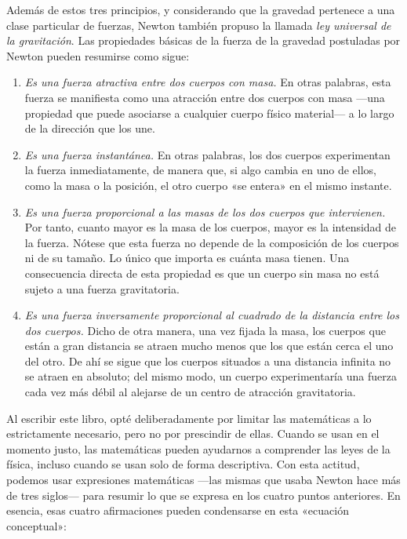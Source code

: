 Además de estos tres principios, y considerando que la gravedad pertenece a una clase
particular de fuerzas, Newton también propuso la llamada \emph{ley universal de la
gravitación}.
Las propiedades básicas de la fuerza de la gravedad
postuladas por Newton pueden resumirse como sigue:

\begin{enumerate}
\item
\emph{Es una fuerza atractiva entre dos cuerpos con masa.} En otras palabras,
esta fuerza se manifiesta como una atracción entre dos cuerpos con masa ---una
propiedad que puede asociarse a cualquier cuerpo físico material--- a lo largo
de la dirección que los une.
\item
\emph{Es una fuerza instantánea.} En otras palabras, los dos cuerpos experimentan
la fuerza inmediatamente, de manera que, si algo cambia en uno de ellos, como la
masa o la posición, el otro cuerpo «se entera» en el mismo instante.
\item
\emph{Es una fuerza proporcional a las masas de los dos cuerpos que intervienen.}
Por tanto, cuanto mayor es la masa de los cuerpos, mayor es la intensidad de la
fuerza. Nótese que esta fuerza no depende de la composición de los cuerpos ni de
su tamaño. Lo único que importa es cuánta masa tienen. Una consecuencia directa
de esta propiedad es que un cuerpo sin masa no está sujeto a una fuerza gravitatoria.
\item
\emph{Es una fuerza inversamente proporcional al cuadrado de la distancia entre
los dos cuerpos.} Dicho de otra manera, una vez fijada la masa, los cuerpos que
están a gran distancia se atraen mucho menos que los que están cerca el uno del
otro. De ahí se sigue que los cuerpos situados a una distancia infinita no se
atraen en absoluto; del mismo modo, un cuerpo experimentaría una fuerza cada vez
más débil al alejarse de un centro de atracción gravitatoria.
\end{enumerate}

Al escribir este libro, opté deliberadamente por limitar las matemáticas a lo
estrictamente necesario, pero no por prescindir de ellas. Cuando se usan en el
momento justo, las matemáticas pueden ayudarnos a comprender las leyes de la
física, incluso cuando se usan solo de forma descriptiva. Con esta actitud,
podemos usar expresiones matemáticas ---las mismas que usaba Newton hace más de
tres siglos--- para resumir lo que se expresa en los cuatro puntos anteriores.
En esencia, esas cuatro afirmaciones pueden condensarse en esta «ecuación conceptual»:

